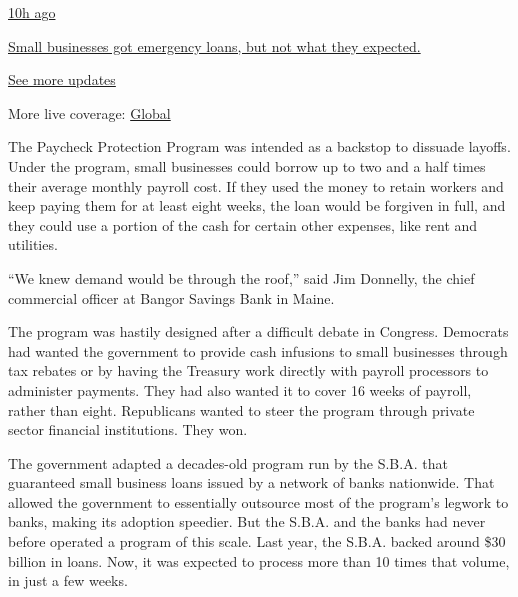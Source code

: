 \href{https://www.nytimes.com/live/2020/08/03/business/stock-market-today-coronavirus?action=click\&pgtype=Article\&state=default\&region=MAIN_CONTENT_1\&context=storylines_live_updates\#small-businesses-got-emergency-loans-but-not-what-they-expected}{10h
ago}

\href{https://www.nytimes.com/live/2020/08/03/business/stock-market-today-coronavirus?action=click\&pgtype=Article\&state=default\&region=MAIN_CONTENT_1\&context=storylines_live_updates\#small-businesses-got-emergency-loans-but-not-what-they-expected}{Small
businesses got emergency loans, but not what they expected.}

\href{https://www.nytimes.com/live/2020/08/03/business/stock-market-today-coronavirus?action=click\&pgtype=Article\&state=default\&region=MAIN_CONTENT_1\&context=storylines_live_updates}{See
more updates}

More live coverage:
\href{https://www.nytimes.com/2020/08/03/world/coronavirus-covid-19.html?action=click\&pgtype=Article\&state=default\&region=MAIN_CONTENT_1\&context=storylines_live_updates}{Global}

The Paycheck Protection Program was intended as a backstop to dissuade
layoffs. Under the program, small businesses could borrow up to two and
a half times their average monthly payroll cost. If they used the money
to retain workers and keep paying them for at least eight weeks, the
loan would be forgiven in full, and they could use a portion of the cash
for certain other expenses, like rent and utilities.

``We knew demand would be through the roof,'' said Jim Donnelly, the
chief commercial officer at Bangor Savings Bank in Maine.

The program was hastily designed after a difficult debate in Congress.
Democrats had wanted the government to provide cash infusions to small
businesses through tax rebates or by having the Treasury work directly
with payroll processors to administer payments. They had also wanted it
to cover 16 weeks of payroll, rather than eight. Republicans wanted to
steer the program through private sector financial institutions. They
won.

The government adapted a decades-old program run by the S.B.A. that
guaranteed small business loans issued by a network of banks nationwide.
That allowed the government to essentially outsource most of the
program's legwork to banks, making its adoption speedier. But the S.B.A.
and the banks had never before operated a program of this scale. Last
year, the S.B.A. backed around \$30 billion in loans. Now, it was
expected to process more than 10 times that volume, in just a few weeks.

